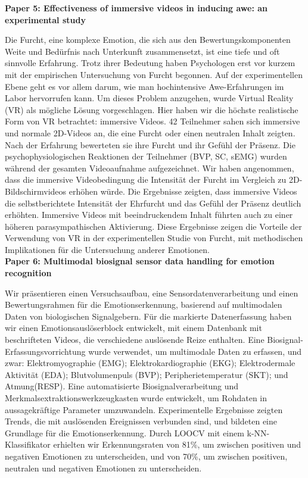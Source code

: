 \textbf{Paper 5: Effectiveness of immersive videos in inducing awe: an experimental study}

Die Furcht, eine komplexe Emotion, die sich aus den Bewertungskomponenten Weite und Bedürfnis nach Unterkunft zusammensetzt, ist eine tiefe und oft sinnvolle Erfahrung. 
Trotz ihrer Bedeutung haben Psychologen erst vor kurzem mit der empirischen Untersuchung von Furcht begonnen. 
Auf der experimentellen Ebene geht es vor allem darum, wie man hochintensive Awe-Erfahrungen im Labor hervorrufen kann. 
Um dieses Problem anzugehen, wurde Virtual Reality (VR) als mögliche Lösung vorgeschlagen. 
Hier haben wir die höchste realistische Form von VR betrachtet: immersive Videos. 
42 Teilnehmer sahen sich immersive und normale 2D-Videos an, die eine Furcht oder einen neutralen Inhalt zeigten. 
Nach der Erfahrung bewerteten sie ihre Furcht und ihr Gefühl der Präsenz. 
Die psychophysiologischen Reaktionen der Teilnehmer (BVP, SC, sEMG) wurden während der gesamten Videoaufnahme aufgezeichnet. 
Wir haben angenommen, dass die immersive Videobedingung die Intensität der Furcht im Vergleich zu 2D-Bildschirmvideos erhöhen würde. 
Die Ergebnisse zeigten, dass immersive Videos die selbstberichtete Intensität der Ehrfurcht und das Gefühl der Präsenz deutlich erhöhten. 
Immersive Videos mit beeindruckendem Inhalt führten auch zu einer höheren parasympathischen Aktivierung. 
Diese Ergebnisse zeigen die Vorteile der Verwendung von VR in der experimentellen Studie von Furcht, mit methodischen Implikationen für die Untersuchung anderer Emotionen. \\


\textbf{Paper 6: Multimodal biosignal sensor data handling for emotion recognition}

Wir präsentieren einen Versuchsaufbau, eine Sensordatenverarbeitung und einen Bewertungsrahmen für die Emotionserkennung, basierend auf multimodalen Daten von biologischen Signalgebern.  
Für die markierte Datenerfassung haben wir einen Emotionsauslöserblock entwickelt, mit einem Datenbank mit beschrifteten Videos, die verschiedene auslösende Reize enthalten. 
Eine Biosignal-Erfassungsvorrichtung wurde verwendet, um multimodale Daten zu erfassen, und zwar: 
Elektromyographie (EMG); Elektrokardiographie (EKG); Elektrodermale Aktivität (EDA); Blutvolumenpuls (BVP); Peripherietemperatur (SKT); und Atmung(RESP). 
Eine automatisierte Biosignalverarbeitung und Merkmalsextraktionswerkzeugkasten wurde entwickelt, um Rohdaten in aussagekräftige Parameter umzuwandeln. 
Experimentelle Ergebnisse zeigten Trends, die mit auslösenden Ereignissen verbunden sind, und bildeten eine Grundlage für die Emotionserkennung. 
Durch LOOCV mit einem k-NN-Klassifikator erhielten wir Erkennungsraten von 81\%, um zwischen positiven und negativen Emotionen zu unterscheiden, und von 70\%, um zwischen positiven, neutralen und negativen Emotionen zu unterscheiden. \\


